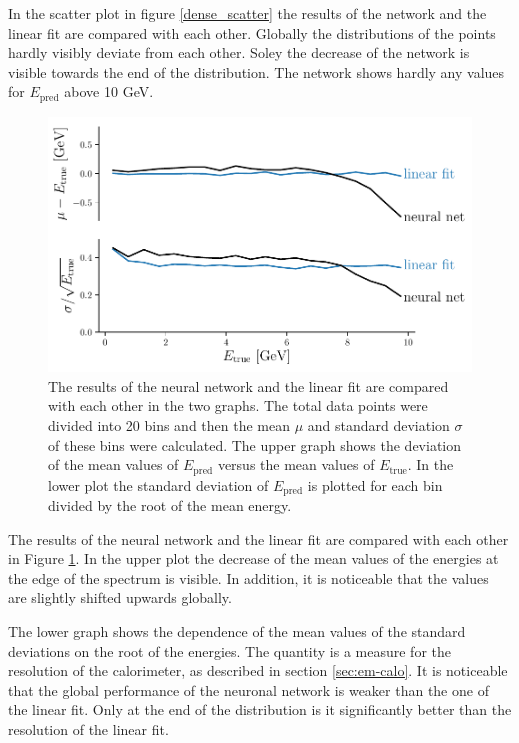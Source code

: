\documentclass[12pt, a4paper]{thesis}
\begin{document}
In the scatter plot in figure \ref{dense_scatter} the results of the
network and the linear fit are compared with each other. Globally the
distributions of the points hardly visibly deviate from each
other. Soley the decrease of the network is visible towards the end of
the distribution.  The network shows hardly any values for
\(E_{\text{pred}}\) above 10 GeV.

\begin{figure}[H]
  \centering
  \includegraphics[width=.9\linewidth]{../images/dense_res.pdf}
  \caption{ The results of the neural network and the linear fit are
    compared with each other in the two graphs. The total data points
    were divided into 20 bins and then the mean \(\mu\) and standard
    deviation \(\sigma\) of these bins were calculated. The upper graph
    shows the deviation of the mean values of \(E_{\text{pred}}\) versus the mean
    values of \(E_{\text{true}}\). In the lower plot the standard deviation of \(E_{\text{pred}}\)
    is plotted for each bin divided by the root of the mean
    energy. }
  \label{dense_res}
\end{figure} 

The results of the neural network and the linear fit are compared with each
other in Figure \ref{dense_res}. In the upper plot the decrease of the mean values
of the energies at the edge of the spectrum is visible. In addition, it is
noticeable that the values are slightly shifted upwards globally.

The lower graph shows the dependence of the mean values of the
standard deviations on the root of the energies. The quantity is a
measure for the resolution of the calorimeter, as described in section
\ref{sec:em-calo}. It is noticeable that the global performance of the
neuronal network is weaker than the one of the linear fit. Only at the
end of the distribution is it significantly better than the resolution
of the linear fit.
\end{document}
